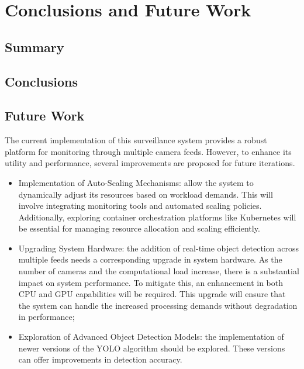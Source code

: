 \chapter{Conclusions and Future Work}
\label{chapter:conclusion}

\newenvironment{conclusion}
{\quote\itshape}
{\endquote}

\begin{conclusion}
\end{conclusion}

\section{Summary}
\section{Conclusions}
\section{Future Work}
The current implementation of this surveillance system provides a robust platform for monitoring through multiple 
camera feeds. However, to enhance its utility and performance, several improvements are proposed for future iterations.

\begin{itemize}
    \item Implementation of Auto-Scaling Mechanisms: allow the system to 
    dynamically adjust its resources based on workload demands. This will involve integrating monitoring tools 
    and automated scaling policies.
    Additionally, exploring container orchestration platforms 
    like Kubernetes will be essential for managing resource allocation and scaling efficiently.
    \item Upgrading System Hardware: the addition of real-time object detection across multiple feeds needs a 
    corresponding upgrade in system hardware. As the number of cameras and the computational load increase, there is 
    a substantial impact on system performance. To mitigate this, an enhancement in both CPU and GPU capabilities will 
    be required. This upgrade will ensure that the system can handle the increased processing demands without degradation 
    in performance;
    \item Exploration of Advanced Object Detection Models: the implementation of newer versions of the YOLO 
    algorithm should be explored. These versions can offer improvements in detection accuracy.
\end{itemize}
